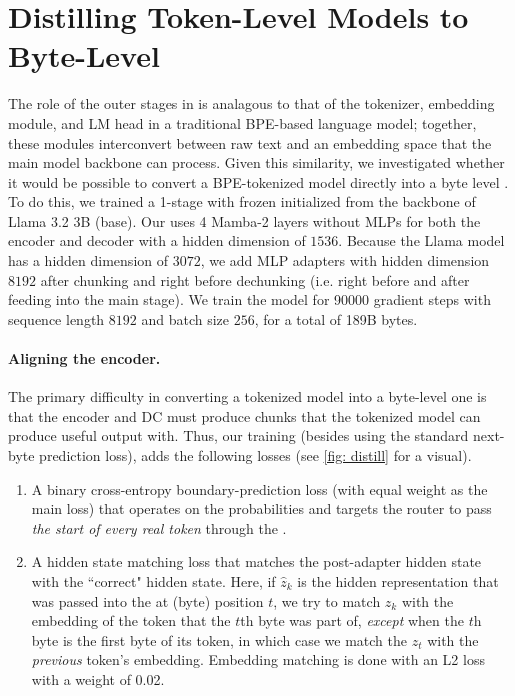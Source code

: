 

\section{Distilling Token-Level Models to Byte-Level}
\label{sec: distill}




The role of the outer stages in \model{} is analagous to that of the tokenizer, embedding module, and LM head in a traditional BPE-based language model; together, these modules interconvert between raw text and an embedding space that the main model backbone can process.
Given this similarity, we investigated whether it would be possible to convert a BPE-tokenized model directly into a byte level \model{}.
To do this, we trained a 1-stage \model{} with frozen \main{} initialized from the backbone of Llama 3.2 3B (base).
Our \model{} uses 4 Mamba-2 layers without MLPs for both the encoder and decoder with a hidden dimension of $1536$.
Because the Llama model has a hidden dimension of $3072$, we add MLP adapters with hidden dimension $8192$ after chunking and right before dechunking (i.e. right before and after feeding into the main stage).
We train the model for 90000 gradient steps with sequence length $8192$ and batch size $256$, for a total of 189B bytes.

\paragraph{Aligning the encoder.} The primary difficulty in converting a tokenized model into a byte-level one is that the encoder and DC must produce chunks that the tokenized model can produce useful output with.
Thus, our training (besides using the standard next-byte prediction loss), adds the following losses (see \cref{fig: distill} for a visual).
\begin{enumerate}
    \item A binary cross-entropy boundary-prediction loss (with equal weight as the main loss) that operates on the \router{} probabilities and targets the router to pass \emph{the start of every real token} through the \main{}.
    \item A hidden state matching loss that matches the post-adapter hidden state with the ``correct" hidden state.
        Here, if $\hat z_k$ is the hidden representation that was passed into the \main{} at (byte) position $t$, we try to match $z_k$ with the embedding of the token that the $t$th byte was part of, \emph{except} when the $t$h byte is the first byte of its token, in which case we match the $z_t$ with the \emph{previous} token's embedding.
        Embedding matching is done with an L2 loss with a weight of 0.02.
\end{enumerate}

